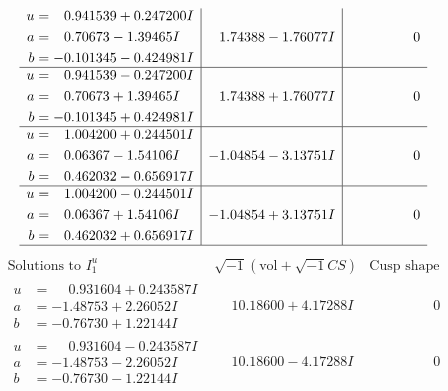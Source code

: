 \documentclass[1p]{elsarticle_modified}
\theoremstyle{definition}
\newcommand{\I}{\sqrt{-1}}
\begin{document}
$$\begin{array}{c|c|c}
\begin{aligned}
u &= \phantom{-}0.941539 + 0.247200 I \\
a &= \phantom{-}0.70673 - 1.39465 I \\
b &= -0.101345 - 0.424981 I\end{aligned}
 & \phantom{-}1.74388 - 1.76077 I & \phantom{-0.000000 } 0 \\ \hline\begin{aligned}
u &= \phantom{-}0.941539 - 0.247200 I \\
a &= \phantom{-}0.70673 + 1.39465 I \\
b &= -0.101345 + 0.424981 I\end{aligned}
 & \phantom{-}1.74388 + 1.76077 I & \phantom{-0.000000 } 0 \\ \hline\begin{aligned}
u &= \phantom{-}1.004200 + 0.244501 I \\
a &= \phantom{-}0.06367 - 1.54106 I \\
b &= \phantom{-}0.462032 - 0.656917 I\end{aligned}
 & -1.04854 - 3.13751 I & \phantom{-0.000000 } 0 \\ \hline\begin{aligned}
u &= \phantom{-}1.004200 - 0.244501 I \\
a &= \phantom{-}0.06367 + 1.54106 I \\
b &= \phantom{-}0.462032 + 0.656917 I\end{aligned}
 & -1.04854 + 3.13751 I & \phantom{-0.000000 } 0\\
 \hline 
 \end{array}$$\newpage$$\begin{array}{c|c|c}  
\text{Solutions to }I^u_{1}& \I (\text{vol} + \sqrt{-1}CS) & \text{Cusp shape}\\
 \hline 
\begin{aligned}
u &= \phantom{-}0.931604 + 0.243587 I \\
a &= -1.48753 + 2.26052 I \\
b &= -0.76730 + 1.22144 I\end{aligned}
 & \phantom{-}10.18600 + 4.17288 I & \phantom{-0.000000 } 0 \\ \hline\begin{aligned}
u &= \phantom{-}0.931604 - 0.243587 I \\
a &= -1.48753 - 2.26052 I \\
b &= -0.76730 - 1.22144 I\end{aligned}
 & \phantom{-}10.18600 - 4.17288 I & \phantom{-0.000000 } 0 \\ \hline\begin{aligned}

\end{aligned}
\end{array}$$
\end{document}
